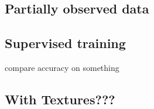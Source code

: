 \subsection{Partially observed data}




\subsection{Supervised training}
compare accuracy on something



\subsection{With Textures???}












